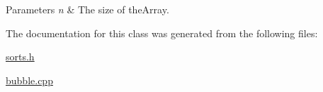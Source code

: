 \begin{DoxyParams}{Parameters}
{\em n} & The size of the\-Array. \\
\hline
\end{DoxyParams}


The documentation for this class was generated from the following files\-:\begin{DoxyCompactItemize}
\item 
\hyperlink{sorts_8h}{sorts.\-h}\item 
\hyperlink{bubble_8cpp}{bubble.\-cpp}\end{DoxyCompactItemize}
